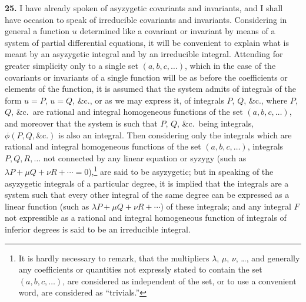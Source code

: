 \documentclass[11pt]{article}
\begin{document}
\textbf{25.} I have already spoken of asyzygetic covariants and invariants, and I shall have occasion to speak of irreducible covariants and invariants. Considering in general a function $u$ determined like a covariant or invariant by means of a system of partial differential equations, it will be convenient to explain what is meant by an asyzygetic integral and by an irreducible integral. Attending for greater simplicity only to a single set $(a, b, c, \ldots)$, which in the case of the covariants or invariants of a single function will be as before the coefficients or elements of the function, it is assumed that the system admits of integrals of the form $u = P$, $u = Q$, \&c., or as we may express it, of integrals $P$, $Q$, \&c., where $P$, $Q$, \&c.\ are rational and integral homogeneous functions of the set $(a, b, c, \ldots)$, and moreover that the system is such that $P$, $Q$, \&c.\ being integrals, $\phi(P, Q, \&\text{c.})$ is also an integral. Then considering only the integrals which are rational and integral homogeneous functions of the set $(a, b, c, \ldots)$, integrals $P, Q, R, \ldots$ not connected by any linear equation or syzygy (such as $\lambda P + \mu Q + \nu R + \cdots = 0$),\footnote{It is hardly necessary to remark, that the multipliers $\lambda$, $\mu$, $\nu$, \ldots, and generally any coefficients or quantities not expressly stated to contain the set $(a, b, c, \ldots)$, are considered as independent of the set, or to use a convenient word, are considered as ``trivials.''} are said to be asyzygetic; but in speaking of the asyzygetic integrals of a particular degree, it is implied that the integrals are a system such that every other integral of the same degree can be expressed as a linear function (such as $\lambda P + \mu Q + \nu R + \cdots$) of these integrals; and any integral $F$ not expressible as a rational and integral homogeneous function of integrals of inferior degrees is said to be an irreducible integral.
\end{document}
